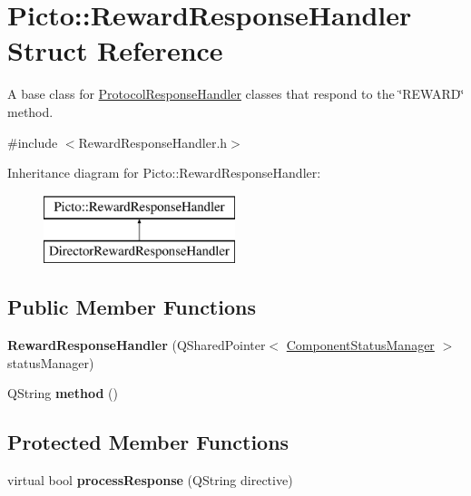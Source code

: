 \hypertarget{struct_picto_1_1_reward_response_handler}{\section{Picto\-:\-:Reward\-Response\-Handler Struct Reference}
\label{struct_picto_1_1_reward_response_handler}
}


A base class for \hyperlink{struct_picto_1_1_protocol_response_handler}{Protocol\-Response\-Handler} classes that respond to the \char`\"{}\-R\-E\-W\-A\-R\-D\char`\"{} method.  




{\ttfamily \#include $<$Reward\-Response\-Handler.\-h$>$}

Inheritance diagram for Picto\-:\-:Reward\-Response\-Handler\-:\begin{figure}[H]
\begin{center}
\leavevmode
\includegraphics[height=2.000000cm]{struct_picto_1_1_reward_response_handler}
\end{center}
\end{figure}
\subsection*{Public Member Functions}
\begin{DoxyCompactItemize}
\item 
\hypertarget{struct_picto_1_1_reward_response_handler_a16d20374d6a1fcc5860f39319255f3dd}{{\bfseries Reward\-Response\-Handler} (Q\-Shared\-Pointer$<$ \hyperlink{class_component_status_manager}{Component\-Status\-Manager} $>$ status\-Manager)}\label{struct_picto_1_1_reward_response_handler_a16d20374d6a1fcc5860f39319255f3dd}

\item 
\hypertarget{struct_picto_1_1_reward_response_handler_ac26d09df60dc7302ade8ef9ad4149c8e}{Q\-String {\bfseries method} ()}\label{struct_picto_1_1_reward_response_handler_ac26d09df60dc7302ade8ef9ad4149c8e}

\end{DoxyCompactItemize}
\subsection*{Protected Member Functions}
\begin{DoxyCompactItemize}
\item 
\hypertarget{struct_picto_1_1_reward_response_handler_a5380b73bbbdc65b1a4c513a9325d1b18}{virtual bool {\bfseries process\-Response} (Q\-String directive)}\label{struct_picto_1_1_reward_response_handler_a5380b73bbbdc65b1a4c513a9325d1b18}

\end{DoxyCompactItemize}


